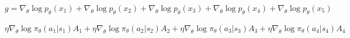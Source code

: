 \documentclass{article}
\begin{document}
$g=\nabla_\theta\log p_\theta(x_1)+\nabla_\theta\log p_\theta(x_2)+\nabla_\theta\log p_\theta(x_3)+\nabla_\theta\log p_\theta(x_4)+\nabla_\theta\log p_\theta(x_5)$

$\eta\nabla_\theta\log\pi_\theta(a_1|s_1)A_1+\eta\nabla_\theta\log\pi_\theta(a_2|s_2)A_2+\eta\nabla_\theta\log\pi_\theta(a_3|s_3)A_3+\eta\nabla_\theta\log\pi_\theta(a_4|s_4)A_4$
\end{document}
